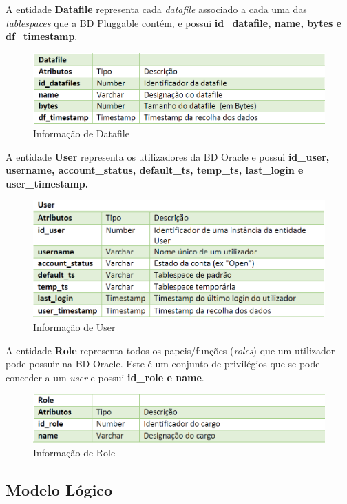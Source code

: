 \documentclass[a4paper]{article}
\begin{document}
A entidade \textbf{Datafile} representa cada \emph{datafile} associado a cada uma das \emph{tablespaces} que a BD Pluggable contém, e possui \textbf{id\_datafile, name, bytes e df\_timestamp}.

\begin{figure}[H]
\centering
\includegraphics[scale=0.65]{datafile.PNG}
\caption{Informação de Datafile}
\end{figure}

A entidade \textbf{User} representa os utilizadores da BD Oracle e possui \textbf{id\_user, username, account\_status, default\_ts, temp\_ts, last\_login e user\_timestamp.}

\begin{figure}[H]
\centering
\includegraphics[scale=0.65]{user.PNG}
\caption{Informação de User}
\end{figure}

A entidade \textbf{Role} representa todos os papeis/funções (\emph{roles}) que um utilizador pode possuir na BD Oracle. Este é um conjunto de privilégios que se pode conceder a um \emph{user} e possui \textbf{id\_role e name}.

\begin{figure}[H]
\centering
\includegraphics[scale=0.65]{role.PNG}
\caption{Informação de Role}
\end{figure}


\newpage
\subsection{Modelo Lógico}
\hspace{3mm} 
\end{document}
